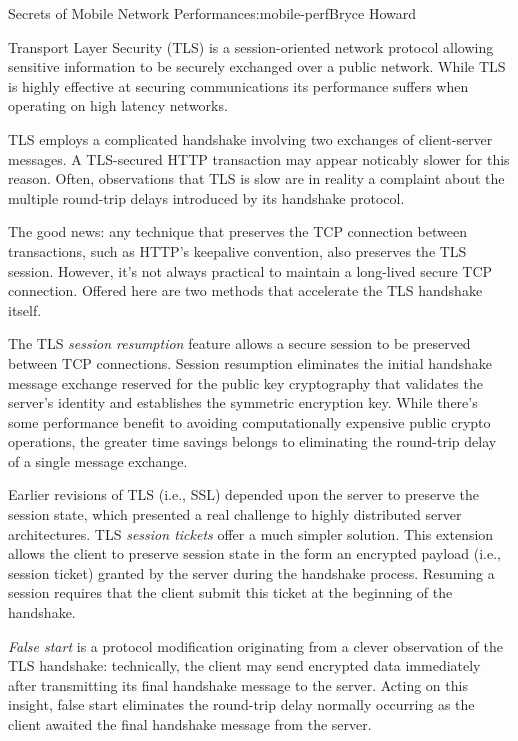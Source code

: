 \begin{aosachapter}{Secrets of Mobile Network Performance}{s:mobile-perf}{Bryce Howard}

Transport Layer Security (TLS) is a session-oriented network protocol
allowing sensitive information to be securely exchanged over a public
network. While TLS is highly effective at securing communications its
performance suffers when operating on high latency networks.

TLS employs a complicated handshake involving two exchanges of
client-server messages. A TLS-secured HTTP transaction may appear
noticably slower for this reason. Often, observations that TLS is slow
are in reality a complaint about the multiple round-trip delays
introduced by its handshake protocol.


The good news: any technique that preserves the TCP connection between
transactions, such as HTTP's keepalive convention, also preserves the TLS
session. However, it's not always practical to maintain a long-lived
secure TCP connection. Offered here are two methods that accelerate the
TLS handshake itself.


The TLS \emph{session resumption} feature allows a secure session to be
preserved between TCP connections. Session resumption eliminates the
initial handshake message exchange reserved for the public key
cryptography that validates the server's identity and establishes the
symmetric encryption key. While there's some performance benefit to
avoiding computationally expensive public crypto operations, the greater
time savings belongs to eliminating the round-trip delay of a single
message exchange.


Earlier revisions of TLS (i.e., SSL) depended upon the server to
preserve the session state, which presented a real challenge to highly
distributed server architectures. TLS \emph{session tickets} offer a
much simpler solution. This extension allows the client to preserve
session state in the form an encrypted payload (i.e., session ticket)
granted by the server during the handshake process. Resuming a session
requires that the client submit this ticket at the beginning of the
handshake.


\emph{False start} is a protocol modification originating from a clever
observation of the TLS handshake: technically, the client may send
encrypted data immediately after transmitting its final handshake
message to the server. Acting on this insight, false start eliminates
the round-trip delay normally occurring as the client awaited the final
handshake message from the server.


\end{aosachapter}
